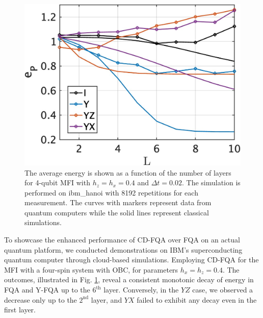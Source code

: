 \documentclass[twocolumn,aps,superscriptaddress,floatfix,longbibliography]{revtex4-2}
\newcommand{\awc}[1]{{\color[rgb]{.8,.6,.6}{[AW: {\it #1}\,]}}}
\def\YX{\ensuremath{\mathit{YX}}\xspace} %
\def\YZ{\ensuremath{\mathit{YZ}}\xspace}
\begin{document}
\begin{figure}
\centering
\includegraphics[scale=.2]{experiment.jpg}
\caption{
    The average energy is shown as a function of the number of
    layers for 4-qubit MFI with $h_z=h_x=0.4$ and $\Delta t = 0.02$.
    The simulation is performed on ibm\_hanoi with 8192
    repetitions for each measurement. The curves with markers
    represent data from quantum computers while the solid lines represent
    classical simulations.
}\label{fig:experiment}
\end{figure}


%

To showcase the enhanced performance of CD-FQA over FQA on an
actual quantum platform, we conducted demonstrations
on IBM's
superconducting quantum computer through cloud-based
simulations. Employing CD-FQA for the MFI with a four-spin system with OBC, for parameters $h_x=h_z=0.4$. The outcomes,
illustrated in Fig. \ref{fig:experiment}, reveal a consistent
monotonic decay of energy in FQA and Y-FQA up to the
$6^{\text{th}}$ layer. Conversely, in the \YZ case, we observed a
decrease only up to the $2^{\text{nd}}$ layer, and \YX failed to
exhibit any decay even in the first layer.
\end{document}
